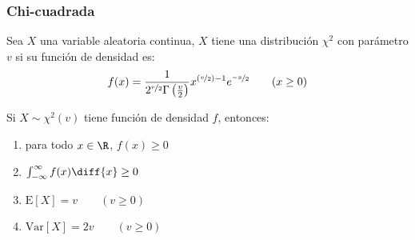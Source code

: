 \subsubsection{Chi-cuadrada}
\begin{Def}
    Sea $X$ una variable aleatoria continua, $X$ tiene una
    distribución $\chi^2$ con parámetro $v$ si su función de densidad
    es:
    \[
        f(x) = \frac{1}{2^{\nicefrac{v}{2}}\Gamma\left(\frac{v}{2}\right)}
        x^{\left(\nicefrac{v}{2}\right)-1}e^{\nicefrac{-x}{2}} \qquad(x\geq0)
    \]  
\end{Def}

\begin{Teo}
    Si $X \sim \chi^2(v)$ tiene función de densidad $f$, entonces:
    \begin{enumerate}
        \item para todo $x\in \R$, $f(x)\geq0$
        \item $\int_{-\infty}^{\infty}f(x)\diff{x}\geq0$
        \item $\text{E}[X]= v \qquad(v\geq0)$
        \item $\text{Var}[X]= 2v \qquad(v\geq0)$
    \end{enumerate}
\end{Teo}

